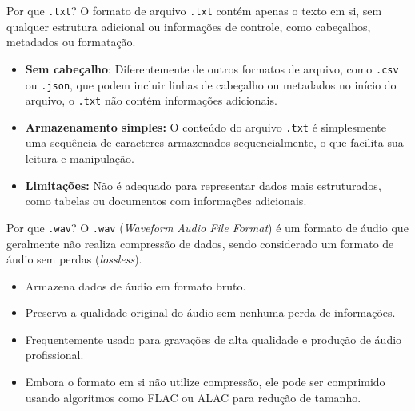 \documentclass{beamer}
\begin{document}
    \begin{frame}{Por que \texttt{.txt}?}
        O formato de arquivo \texttt{.txt} contém apenas o texto em si, sem qualquer estrutura adicional ou informações de controle, como cabeçalhos, metadados ou formatação.

        \begin{itemize}
            \item \textbf{Sem cabeçalho}: Diferentemente de outros formatos de arquivo, como \texttt{.csv} ou \texttt{.json}, que podem incluir linhas de cabeçalho ou metadados no início do arquivo, o \texttt{.txt} não contém informações adicionais.
            \item \textbf{Armazenamento simples:} O conteúdo do arquivo \texttt{.txt} é simplesmente uma sequência de caracteres armazenados sequencialmente, o que facilita sua leitura e manipulação.
            \item \textbf{Limitações:} Não é adequado para representar dados mais estruturados, como tabelas ou documentos com informações adicionais.
        \end{itemize}
    \end{frame}

    \begin{frame}{Por que \texttt{.wav}?}
        O \texttt{.wav} (\textit{Waveform Audio File Format}) é um formato de áudio que geralmente não realiza
        compressão de dados, sendo considerado um formato de áudio sem perdas (\textit{lossless}).
        
        \begin{itemize}
            \item Armazena dados de áudio em formato bruto.
            \item Preserva a qualidade original do áudio sem nenhuma perda de informações.
            \item Frequentemente usado para gravações de alta qualidade e produção de áudio profissional.
            \item Embora o formato em si não utilize compressão, ele pode ser comprimido usando algoritmos como FLAC ou ALAC para redução de tamanho.
        \end{itemize}
    \end{frame}
    
\end{document}
